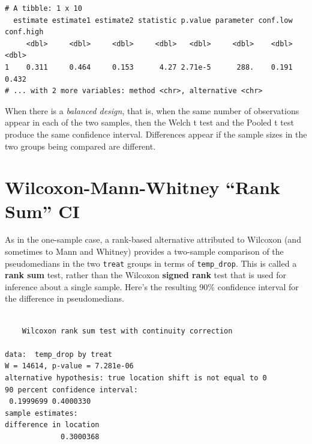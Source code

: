 \documentclass[
]{book}
\newenvironment{Shaded}{\begin{snugshade}}{\end{snugshade}}
\newcommand{\DataTypeTok}[1]{\textcolor[rgb]{0.13,0.29,0.53}{#1}}
\newcommand{\FloatTok}[1]{\textcolor[rgb]{0.00,0.00,0.81}{#1}}
\newcommand{\KeywordTok}[1]{\textcolor[rgb]{0.13,0.29,0.53}{\textbf{#1}}}
\newcommand{\NormalTok}[1]{#1}
\newcommand{\OperatorTok}[1]{\textcolor[rgb]{0.81,0.36,0.00}{\textbf{#1}}}
\newcommand{\OtherTok}[1]{\textcolor[rgb]{0.56,0.35,0.01}{#1}}
\newcommand{\StringTok}[1]{\textcolor[rgb]{0.31,0.60,0.02}{#1}}
\begin{document}
\begin{verbatim}
# A tibble: 1 x 10
  estimate estimate1 estimate2 statistic p.value parameter conf.low conf.high
     <dbl>     <dbl>     <dbl>     <dbl>   <dbl>     <dbl>    <dbl>     <dbl>
1    0.311     0.464     0.153      4.27 2.71e-5      288.    0.191     0.432
# ... with 2 more variables: method <chr>, alternative <chr>
\end{verbatim}

When there is a \emph{balanced design}, that is, when the same number of observations appear in each of the two samples, then the Welch t test and the Pooled t test produce the same confidence interval. Differences appear if the sample sizes in the two groups being compared are different.

\hypertarget{wilcoxon-mann-whitney-rank-sum-ci}{%
\section{Wilcoxon-Mann-Whitney ``Rank Sum'' CI}\label{wilcoxon-mann-whitney-rank-sum-ci}}

As in the one-sample case, a rank-based alternative attributed to Wilcoxon (and sometimes to Mann and Whitney) provides a two-sample comparison of the pseudomedians in the two \texttt{treat} groups in terms of \texttt{temp\_drop}. This is called a \textbf{rank sum} test, rather than the Wilcoxon \textbf{signed rank} test that is used for inference about a single sample. Here's the resulting 90\% confidence interval for the difference in pseudomedians.

\begin{Shaded}
\end{Shaded}

\begin{verbatim}

	Wilcoxon rank sum test with continuity correction

data:  temp_drop by treat
W = 14614, p-value = 7.281e-06
alternative hypothesis: true location shift is not equal to 0
90 percent confidence interval:
 0.1999699 0.4000330
sample estimates:
difference in location 
             0.3000368 
\end{verbatim}
\end{document}

